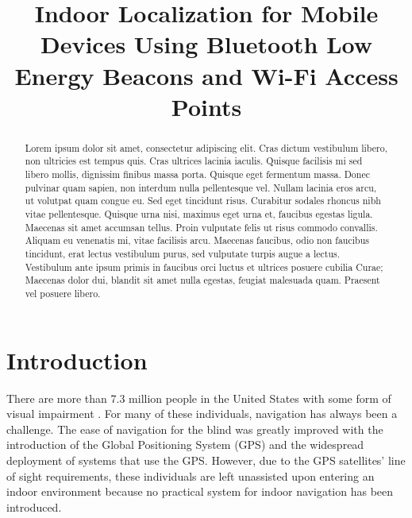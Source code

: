 \documentclass[conference]{IEEEtran}
\begin{document}
\title{Indoor Localization for Mobile Devices Using Bluetooth Low Energy Beacons and Wi-Fi Access Points}

\author{
\and
{}
}

\maketitle

\begin{abstract}
Lorem ipsum dolor sit amet, consectetur adipiscing elit. Cras dictum vestibulum libero, non ultricies est tempus quis. Cras ultrices lacinia iaculis. Quisque facilisis mi sed libero mollis, dignissim finibus massa porta. Quisque eget fermentum massa. Donec pulvinar quam sapien, non interdum nulla pellentesque vel. Nullam lacinia eros arcu, ut volutpat quam congue eu. Sed eget tincidunt risus. Curabitur sodales rhoncus nibh vitae pellentesque. Quisque urna nisi, maximus eget urna et, faucibus egestas ligula. Maecenas sit amet accumsan tellus. Proin vulputate felis ut risus commodo convallis. Aliquam eu venenatis mi, vitae facilisis arcu. Maecenas faucibus, odio non faucibus tincidunt, erat lectus vestibulum purus, sed vulputate turpis augue a lectus. Vestibulum ante ipsum primis in faucibus orci luctus et ultrices posuere cubilia Curae; Maecenas dolor dui, blandit sit amet nulla egestas, feugiat malesuada quam. Praesent vel posuere libero.\end{abstract}

\section{Introduction}
There are more than 7.3 million people in the United States with some form of visual impairment \cite{nfb.org}. For many of these individuals, navigation has always been a challenge. The ease of navigation for the blind was greatly improved with the introduction of the Global Positioning System (GPS) and the widespread deployment of systems that use the GPS. However, due to the GPS satellites’ line of sight requirements, these individuals are left unassisted upon entering an indoor environment because no practical system for indoor navigation has been introduced.
\end{document}
